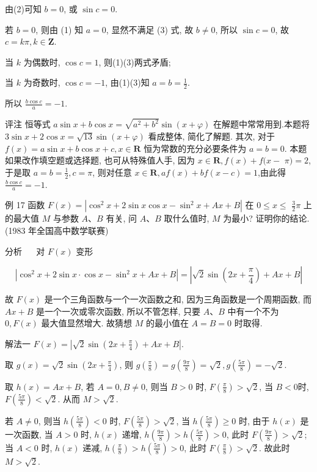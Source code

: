 	由(2)可知 $b=0$, 或 $\sin c=0$.

	若 $b=0$, 则由 (1) 知 $a=0$, 显然不满足 (3) 式, 故 $b \neq 0$, 所以 $\sin c=0$, 故 $c=k \pi, k \in \mathbf{Z}$.

	当 $k$ 为偶数时, $\cos c=1$, 则(1)(3)两式矛盾;

	当 $k$ 为奇数时, $\cos c=-1$, 由(1)(3)知 $a=b=\frac{1}{2}$.

	所以 $\frac{b \cos c}{a}=-1$.

	评注 恒等式 $a \sin x+b \cos x=\sqrt{a^{2}+b^{2}} \sin (x+\varphi)$ 在解题中常常用到.本题将 $3 \sin x+2 \cos x=\sqrt{13} \sin (x+\varphi)$ 看成整体, 简化了解题. 其次, 对于 $f(x)=a \sin x+b \cos x+c, x \in \mathbf{R}$ 恒为常数的充分必要条件为 $a=b=0$. 本题如果改作填空题或选择题, 也可从特殊值人手, 因为 $x \in \mathbf{R}, f(x)+f(x-$ $\pi)=2$, 于是取 $a=b=\frac{1}{2}, c=\pi$, 则对任意 $x \in \mathbf{R}, a f(x)+b f(x-c)=1$,由此得 $\frac{b \cos c}{a}=-1$.

	例 17 函数 $F(x)=\left|\cos ^{2} x+2 \sin x \cos x-\sin ^{2} x+A x+B\right|$ 在 $0 \leqslant x \leqslant$ $\frac{3}{2} \pi$ 上的最大值 $M$ 与参数 $A 、 B$ 有关, 问 $A 、 B$ 取什么值时, $M$ 为最小? 证明你的结论. (1983 年全国高中数学联赛)

	分析 $\quad$ 对 $F(x)$ 变形

	$$
		\left|\cos ^{2} x+2 \sin x \cdot \cos x-\sin ^{2} x+A x+B\right|=\left|\sqrt{2} \sin \left(2 x+\frac{\pi}{4}\right)+A x+B\right|
	$$

	故 $F(x)$ 是一个三角函数与一个一次函数之和, 因为三角函数是一个周期函数, 而 $A x+B$ 是一个一次或零次函数, 所以不管怎样, 只要 $A 、 B$ 中有一个不为 $0, F(x)$ 最大值显然增大. 故猜想 $M$ 的最小值在 $A=B=0$ 时取得.

	解法一 $F(x)=\left|\sqrt{2} \sin \left(2 x+\frac{\pi}{4}\right)+A x+B\right|$.

	取 $g(x)=\sqrt{2} \sin \left(2 x+\frac{\pi}{4}\right)$, 则 $g\left(\frac{\pi}{8}\right)=g\left(\frac{9 \pi}{8}\right)=\sqrt{2}, g\left(\frac{5 \pi}{8}\right)=-\sqrt{2}$.

	取 $h(x)=A x+B$, 若 $A=0, B \neq 0$, 则当 $B>0$ 时, $F\left(\frac{\pi}{8}\right)>\sqrt{2}$, 当 $B<0$时, $F\left(\frac{5 \pi}{8}\right)<\sqrt{2}$. 从而 $M>\sqrt{2}$.

	若 $A \neq 0$, 则当 $h\left(\frac{5 \pi}{8}\right)<0$ 时, $F\left(\frac{5 \pi}{8}\right)>\sqrt{2}$, 当 $h\left(\frac{5 \pi}{8}\right) \geqslant 0$ 时, 由于 $h(x)$ 是\\
	一次函数, 当 $A>0$ 时, $h(x)$ 递增, $h\left(\frac{9 \pi}{8}\right)>h\left(\frac{5 \pi}{8}\right)>0$, 此时 $F\left(\frac{9 \pi}{8}\right)>\sqrt{2}$; 当 $A<0$ 时, $h(x)$ 递减, $h\left(\frac{\pi}{8}\right)>h\left(\frac{5 \pi}{8}\right)>0$, 此时 $F\left(\frac{\pi}{8}\right)>\sqrt{2}$. 故此时 $M>\sqrt{2}$.

